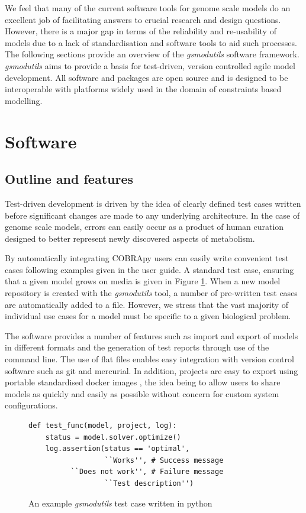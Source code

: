 \documentclass[journal=asbcd6,10pt]{achemso}
\begin{document}
We feel that many of the current software tools for genome scale models do an excellent job of facilitating answers to crucial research and design questions.
However, there is a major gap in terms of the reliability and re-usability of models due to a lack of standardisation and software tools to aid such processes.
The following sections provide an overview of the \textit{gsmodutils} software framework.
\textit{gsmodutils} aims to provide a basis for test-driven, version controlled agile model development.
All software and packages are open source and is designed to be interoperable with platforms widely used in the domain of constraints based modelling.

\section{Software}

\subsection{Outline and features}
Test-driven development is driven by the idea of clearly defined test cases written before significant changes are made to any underlying architecture.
In the case of genome scale models, errors can easily occur as a product of human curation designed to better represent newly discovered aspects of metabolism.

By automatically integrating COBRApy \cite{ebrahim2013cobrapy} users can easily write convenient test cases following examples given in the user guide.
A standard test case, ensuring that a given model grows on media is given in Figure \ref{fig:test_case}.
When a new model repository is created with the \textit{gsmodutils} tool, a number of pre-written test cases are automatically added to a file.
However, we stress that the vast majority of individual use cases for a model must be specific to a given biological problem.

The software provides a number of features such as import and export of models in different formats and the generation of test reports through use of the command line. 
The use of flat files enables easy integration with version control software such as git and mercurial.
In addition, projects are easy to export using portable standardised docker images \cite{merkel2014docker}, the idea being to allow users to share models as quickly and easily as possible without concern for custom system configurations.

\begin{figure}[ht]

\lstset{language=python}   
\begin{lstlisting}
def test_func(model, project, log):
    status = model.solver.optimize()
    log.assertion(status == 'optimal',
                  ``Works'', # Success message
		  ``Does not work'', # Failure message
                  ``Test description'')
\end{lstlisting}
\caption{An example \textit{gsmodutils} test case written in python}
\label{fig:test_case} 
\end{figure}
\end{document}
